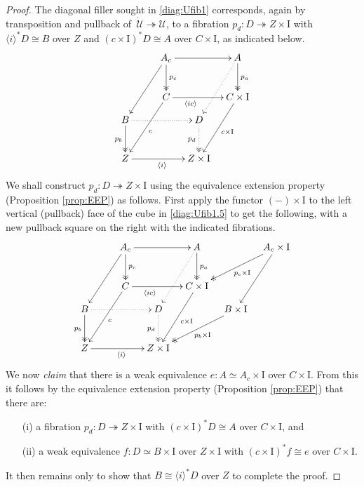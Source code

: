 \documentclass[11pt]{amsart}
\newcommand{\fib}{\ensuremath{\twoheadrightarrow}}
\newcommand{\gph}[1]{\ensuremath{\langle #1 \rangle}}
\newcommand{\I}{\ensuremath{\mathrm{I}}}
\newcommand{\U}{\ensuremath{\mathcal{U}}}
\newcommand{\UU}{\ensuremath{\,\dot{\mathcal{U}}}}
\theoremstyle{remark}
\theoremstyle{definition}
\begin{document}
\begin{proof}
The diagonal filler sought in \eqref{diag:Ufib1} corresponds, again by transposition and pullback of $\UU\fib\U$, to a fibration $p_d : D\fib Z\times \I$ with $\langle i\rangle^*D \cong B$ over $Z$ and $(c\times \I)^*D \cong A$ over $C\times \I$, as indicated below.
\begin{equation}\label{diag:Ufib1.5}
\xymatrix@=1em{
&& \ar[llddd] A_c \ar@{->>}[dd]^{p_c} \ar[rr]  &&  \ar@{..>}[lddd] A \ar@{->>}[dd]^{p_a} \\
&& && \\
&& \ar[llddd]^c C \ar[rr]_<<<<<<<{\gph{ic}}  &&  \ar[lddd]^{c\times\I} C\times\I \\
B \ar@{->>}[dd]_{p_b} \ar@{..>}[rrr] &&& D \ar@{..>>}[dd]_{p_d} & \\
&&&& \\
Z \ar[rrr]_{\gph{i}} &&& Z\times\I &
}
\end{equation}
We shall construct  $p_d : D\fib Z\times \I$ using the equivalence extension property (Proposition \ref{prop:EEP}) as follows.  First apply the functor $(-)\times\I$ to the left vertical (pullback) face of the cube in \eqref{diag:Ufib1.5} to get the following, with a new pullback square on the right with the indicated fibrations.
\begin{equation}\label{diag:Ufib2}
\begin{gathered}
\xymatrix@=1em{
&& \ar[llddd] A_c \ar@{->>}[dd]^{p_c} \ar[rr]  &&  \ar@{..>}[lddd] A \ar@{->>}[dd]^{p_a} &&  \ar@{->>}[lldd]^{p_c\times \I} A_c\times\I \ar[lddd]  \\
&& && &&\\
&& \ar[llddd]^c C  \ar[rr]_<<<<<<<{\gph{ic}}  &&  \ar[lddd]^{c\times\I} C\times\I && \\
B \ar@{->>}[dd]_{p_b} \ar@{..>}[rrr] &&& D \ar@{..>>}[dd]_{p_d} && \ar@{->>}[lldd]^{p_b\times\I} B\times\I &\\
&&&& &&\\
Z \ar[rrr]_{\gph{i}} &&& Z\times\I &&&
}
\end{gathered}
\end{equation}
We now \emph{claim} that  there is a weak equivalence $e:A \simeq A_c \times \I$ over $C\times \I$. From this it  follows by the equivalence extension property (Proposition \ref{prop:EEP}) that there are:
\begin{enumerate}
\item[(i)] a fibration $p_d : D\fib Z\times \I$ with $(c\times\I)^*D \cong A$ over $C\times\I$, and 
\item[(ii)] a weak equivalence $f:D\simeq B\times\I$ over $Z\times \I$ with $(c\times\I)^*f \cong e$ over $C\times\I$. 
\end{enumerate}
It then remains only to show that $B\cong \gph{i}^*D$ over $Z$ to complete the proof.


\end{proof}
\end{document}
